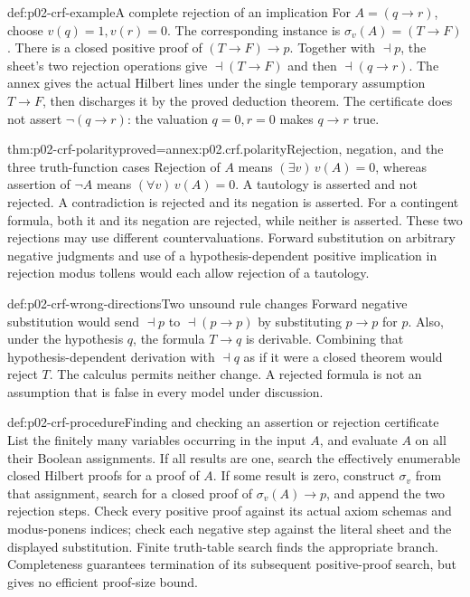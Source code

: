 \begin{hbexample}{def:p02-crf-example}{A complete rejection of an implication}
For \(A=(q\to r)\), choose \(v(q)=1,v(r)=0\).
The corresponding instance is \(\sigma_v(A)=(T\to F)\).
There is a closed positive proof of \((T\to F)\to p\).
Together with \(\dashv p\), the sheet's two rejection operations
give \(\dashv(T\to F)\) and then \(\dashv(q\to r)\).
The annex gives the actual Hilbert lines under the single temporary
assumption \(T\to F\), then discharges it by the proved deduction
theorem. The certificate does not assert \(\neg(q\to r)\): the
valuation \(q=0,r=0\) makes \(q\to r\) true.
\end{hbexample}

\begin{hbtheorem}{thm:p02-crf-polarity}{proved=annex:p02.crf.polarity}{Rejection, negation, and the three truth-function cases}
Rejection of \(A\) means \((\exists v)\,v(A)=0\), whereas assertion
of \(\neg A\) means \((\forall v)\,v(A)=0\).
A tautology is asserted and not rejected. A contradiction is rejected
and its negation is asserted. For a contingent formula, both it and
its negation are rejected, while neither is asserted. These two
rejections may use different countervaluations.
Forward substitution on arbitrary negative judgments and use of a
hypothesis-dependent positive implication in rejection modus tollens
would each allow rejection of a tautology.
\end{hbtheorem}

\begin{hbwarning}{def:p02-crf-wrong-directions}{Two unsound rule changes}
Forward negative substitution would send \(\dashv p\) to
\(\dashv(p\to p)\) by substituting \(p\to p\) for \(p\).
Also, under the hypothesis \(q\), the formula \(T\to q\) is
derivable. Combining that hypothesis-dependent derivation with
\(\dashv q\) as if it were a closed theorem would reject \(T\).
The calculus permits neither change. A rejected formula is not an
assumption that is false in every model under discussion.
\end{hbwarning}

\begin{hbmethod}{def:p02-crf-procedure}{Finding and checking an assertion or rejection certificate}
List the finitely many variables occurring in the input \(A\), and
evaluate \(A\) on all their Boolean assignments. If all results are
one, search the effectively enumerable closed Hilbert proofs for a
proof of \(A\). If some result is zero, construct \(\sigma_v\)
from that assignment, search for a closed proof of
\(\sigma_v(A)\to p\), and append the two rejection steps.
Check every positive proof against its actual axiom schemas and
modus-ponens indices; check each negative step against the literal
sheet and the displayed substitution. Finite truth-table search finds
the appropriate branch. Completeness guarantees termination of its
subsequent positive-proof search, but gives no efficient proof-size
bound.
\end{hbmethod}

